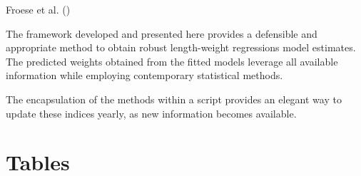 \documentclass[12pt]{article}\usepackage[]{graphicx}\usepackage[]{color}
\begin{document}
Froese et al. ()

The framework developed and presented here provides a defensible and appropriate method to obtain robust length-weight regressions model estimates. The predicted weights obtained from the fitted models leverage all available information while employing contemporary statistical methods.

The encapsulation of the methods within a script provides an elegant way to update these indices yearly, as new information becomes available.

\clearpage

\section{Tables}\label{tables}
\end{document}
